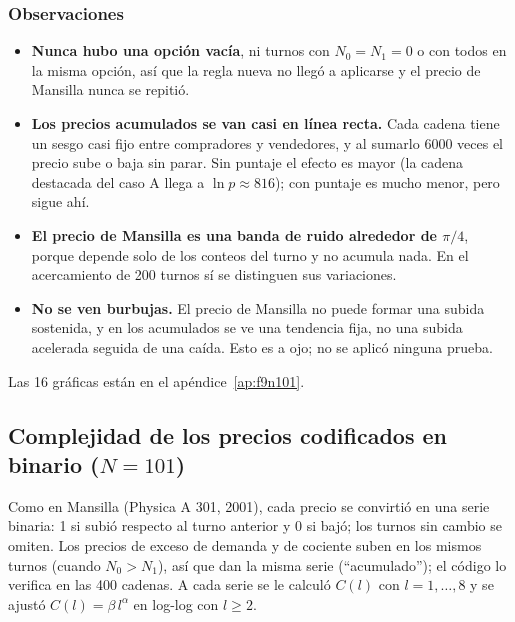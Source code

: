 \documentclass[11pt,letterpaper]{article}
\begin{document}
\subsubsection*{Observaciones}
\begin{itemize}
\item \textbf{Nunca hubo una opción vacía}, ni turnos con $N_0=N_1=0$ o con todos en la misma opción, así que la regla nueva no llegó a aplicarse y el precio de Mansilla nunca se repitió.
\item \textbf{Los precios acumulados se van casi en línea recta.} Cada cadena tiene un sesgo casi fijo entre compradores y vendedores, y al sumarlo 6000 veces el precio sube o baja sin parar. Sin puntaje el efecto es mayor (la cadena destacada del caso A llega a $\ln p\approx 816$); con puntaje es mucho menor, pero sigue ahí.
\item \textbf{El precio de Mansilla es una banda de ruido alrededor de $\pi/4$}, porque depende solo de los conteos del turno y no acumula nada. En el acercamiento de 200 turnos sí se distinguen sus variaciones.
\item \textbf{No se ven burbujas.} El precio de Mansilla no puede formar una subida sostenida, y en los acumulados se ve una tendencia fija, no una subida acelerada seguida de una caída. Esto es a ojo; no se aplicó ninguna prueba.
\end{itemize}
Las 16 gráficas están en el apéndice~\ref{ap:f9n101}.

\subsection{Complejidad de los precios codificados en binario ($N=101$)}
Como en Mansilla (Physica A 301, 2001), cada precio se convirtió en una serie binaria: 1 si subió respecto al turno anterior y 0 si bajó; los turnos sin cambio se omiten. Los precios de exceso de demanda y de cociente suben en los mismos turnos (cuando $N_0>N_1$), así que dan la misma serie (``acumulado''); el código lo verifica en las 400 cadenas. A cada serie se le calculó $C(l)$ con $l=1,\dots,8$ y se ajustó $C(l)=\beta\,l^{\alpha}$ en log-log con $l\ge 2$.
\end{document}
